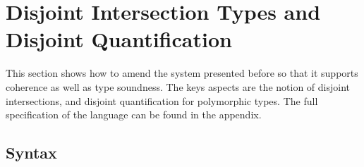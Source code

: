 \section{Disjoint Intersection Types and Disjoint Quantification}

This section shows how to amend the system presented before so that it supports
coherence as well as type soundness. The keys aspects are the notion of disjoint
intersections, and disjoint quantification for polymorphic types. The full
specification of the language can be found in the appendix.

%

%
%
%

\subsection{Syntax}

